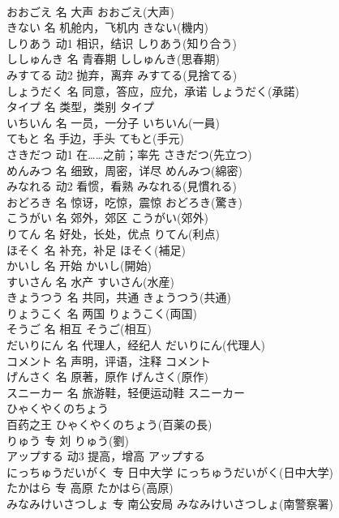 \documentclass[8pt]{extreport}
\begin{document}
\begin{CJK}{UTF8}{min}
\\	おおごえ	名	大声	おおごえ(大声)	
\\	きない	名	机舱内，飞机内	きない(機内)	
\\	しりあう	动1	相识，结识	しりあう(知り合う)	
\\	ししゅんき	名	青春期	ししゅんき(思春期)	
\\	みすてる	动2	抛弃，离弃	みすてる(見捨てる)	
\\	しょうだく	名	同意，答应，应允，承诺	しょうだく(承諾)	
\\	タイプ	名	类型，类别	タイプ	
\\	いちいん	名	一员，一分子	いちいん(一員)	
\\	てもと	名	手边，手头	てもと(手元)	
\\	さきだつ	动1	在……之前；率先	さきだつ(先立つ)	
\\	めんみつ	名	细致，周密，详尽	めんみつ(綿密)	
\\	みなれる	动2	看惯，看熟	みなれる(見慣れる)	
\\	おどろき	名	惊讶，吃惊，震惊	おどろき(驚き)	
\\	こうがい	名	郊外，郊区	こうがい(郊外)	
\\	りてん	名	好处，长处，优点	りてん(利点)	
\\	ほそく	名	补充，补足	ほそく(補足)	
\\	かいし	名	开始	かいし(開始)	
\\	すいさん	名	水产	すいさん(水産)	
\\	きょうつう	名	共同，共通	きょうつう(共通)	
\\	りょうこく	名	两国	りょうこく(両国)	
\\	そうご	名	相互	そうご(相互)	
\\	だいりにん	名	代理人，经纪人	だいりにん(代理人)	
\\	コメント	名	声明，评语，注释	コメント	
\\	げんさく	名	原著，原作	げんさく(原作)	
\\	スニーカー	名	旅游鞋，轻便运动鞋	スニーカー	
\\	ひゃくやくのちょう	
\\	百药之王	ひゃくやくのちょう(百薬の長)	
\\	りゅう	专	刘	りゅう(劉)	
\\	アップする	动3	提高，增高	アップする	
\\	にっちゅうだいがく	专	日中大学	にっちゅうだいがく(日中大学)	
\\	たかはら	专	高原	たかはら(高原)	
\\	みなみけいさつしょ	专	南公安局	みなみけいさつしょ(南警察署)	

\end{CJK}
\end{document}
